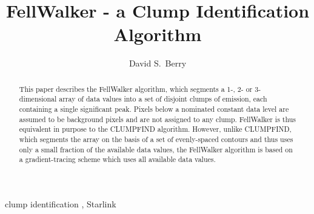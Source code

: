 \documentclass[final,authoryear,5p,times,twocolumn]{elsarticle}
\begin{document}
\begin{frontmatter}



\title{FellWalker - a Clump Identification Algorithm }


\author[jac]{David S.\ Berry}


\address[jac]{Joint Astronomy Centre, 660 N.\ A`oh\=ok\=u Place, Hilo, HI
  96720, USA}

\begin{abstract}

This paper describes the FellWalker algorithm, which segments a 1-, 2- or
3-dimensional array of data values into a set of disjoint clumps of
emission, each containing a single significant peak. Pixels below a
nominated constant data level are assumed to be background pixels and are
not assigned to any clump. FellWalker is thus equivalent in purpose to
the CLUMPFIND algorithm. However, unlike CLUMPFIND, which segments the
array on the basis of a set of evenly-spaced contours and thus uses only
a small fraction of the available data  values, the FellWalker algorithm
is based on a gradient-tracing scheme which uses all available data values.

\end{abstract}

\begin{keyword}


clump identification \sep
Starlink

\end{keyword}

\end{frontmatter}
\end{document}

